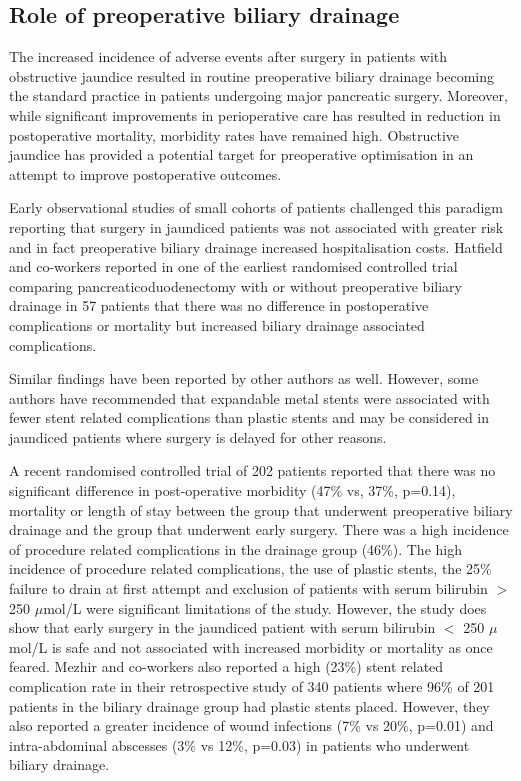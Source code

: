 \subsection{Role of preoperative biliary drainage}
\label{sec:preoperative_biliary_drainage}
The increased incidence of adverse events after surgery in patients with obstructive jaundice resulted in routine preoperative biliary drainage becoming the standard practice in patients undergoing major pancreatic surgery. Moreover, while significant improvements in perioperative care has resulted in reduction in postoperative mortality, morbidity rates have remained high. Obstructive jaundice has provided a potential target for preoperative optimisation in an attempt to improve postoperative outcomes.  

Early observational studies of small cohorts of patients challenged this paradigm reporting that surgery in jaundiced patients was not associated with greater risk and in fact preoperative biliary drainage increased hospitalisation costs. \parencite{snellen_influence_1985, bakkevold_morbidity_1993, pitt_does_1985} Hatfield and co-workers reported in one of the earliest randomised controlled trial comparing pancreaticoduodenectomy with or without preoperative biliary drainage in 57 patients that there was no difference in postoperative complications or mortality but increased biliary drainage associated complications. \parencite{hatfield_preoperative_1982}

Similar findings have been reported by other authors as well. \parencite{lai_preoperative_1994, lai_preoperative_1994, jagannath_effect_2005} However, some authors have recommended that expandable metal stents were associated with fewer stent related complications than plastic stents and may be considered in jaundiced patients where surgery is delayed for other reasons. \parencite{wasan_use_2005, mullen_pancreaticoduodenectomy_2005}

A recent randomised controlled trial of 202 patients reported that there was no significant difference in post-operative morbidity (47\% vs, 37\%, p=0.14), mortality or length of stay between the group that underwent preoperative biliary drainage and the group that underwent early surgery. There was a high incidence of procedure related complications in the drainage group (46\%). The high incidence of procedure related complications, the use of plastic stents, the 25\% failure to drain at first attempt and exclusion of patients with serum bilirubin $>$ 250 $\mu$mol/L were significant limitations of the study. However, the study does show that early surgery in the jaundiced patient with serum bilirubin $<$ 250 $\mu$mol/L is safe and not associated with increased morbidity or mortality as once feared. Mezhir and co-workers also reported a high (23\%) stent related complication rate in their retrospective study of 340 patients where 96\% of 201 patients in the biliary drainage group had plastic stents placed. However, they also reported a greater incidence of wound infections (7\% vs 20\%, p=0.01) and intra-abdominal abscesses (3\% vs 12\%, p=0.03) in patients who underwent biliary drainage.

